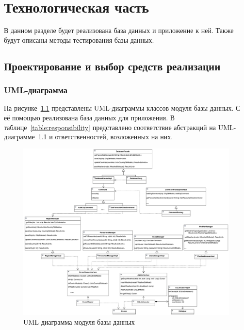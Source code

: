 \chapter{Технологическая часть}
В данном разделе будет реализована база данных и приложение к ней.
Также будут описаны методы тестирования базы данных.

\section{Проектирование и выбор средств реализации}

\subsection{UML-диаграмма}
На рисунке~\ref{fig:db_uml} представлены UML-диаграммы классов модуля базы данных.
С её помощью реализована база данных для приложения.
В таблице~\ref{table:responsibility} представлено соответствие абстракций на UML-диаграмме~\ref{fig:db_uml} и ответственностей, возложенных на них.

\begin{figure}[H]
	\centering
	\includegraphics[width=\textwidth, height=0.65\textheight]{tools/img/db_uml.png}
	\caption{
        UML-диаграмма модуля базы данных
    }
	\label{fig:db_uml}
\end{figure}

